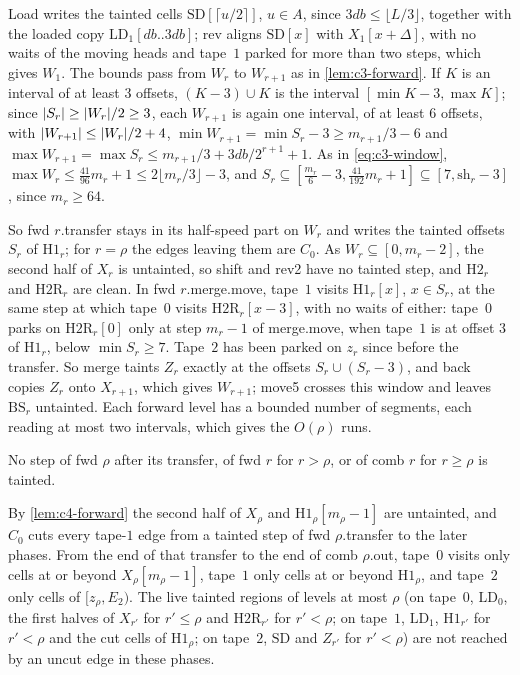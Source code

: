 \begin{informalproof}
Load writes the tainted cells $\mathrm{SD}[\lceil u/2\rceil]$, $u\in A$, since $3db\le\lfloor L/3\rfloor$, together with the loaded
copy $\mathrm{LD}_1[db..3db]$; rev aligns $\mathrm{SD}[x]$ with $X_1[x+\Delta]$, with no waits of the moving heads and tape~$1$ parked for
more than two steps, which gives $W_1$. The bounds pass from $W_r$ to $W_{r+1}$ as in \cref{lem:c3-forward}. If $K$ is an interval of
at least $3$ offsets, $(K-3)\cup K$ is the interval $[\min K-3,\max K]$; since $\lvert S_r \rvert\ge\lvert W_r \rvert/2\ge3$, each $W_{r+1}$ is again one
interval, of at least $6$ offsets, with $\lvert W_{r+1} \rvert\le\lvert W_r \rvert/2+4$, $\min W_{r+1}=\min S_r-3\ge m_{r+1}/3-6$ and
$\max W_{r+1}=\max S_r\le m_{r+1}/3+3db/2^{r+1}+1$. As in \eqref{eq:c3-window}, $\max W_r\le\frac{41}{96}m_r+1\le2\lfloor m_r/3\rfloor-3$,
and $S_r\subseteq[\frac{m_r}6-3,\frac{41}{192}m_r+1]\subseteq[7,\mathrm{sh}_r-3]$, since $m_r\ge64$.

So fwd $r$.transfer stays in its half-speed part on $W_r$ and writes the tainted offsets $S_r$ of $\mathrm{H1}_r$; for $r=\rho$ the
edges leaving them are $C_0$. As $W_r\subseteq[0,m_r-2]$, the second half of $X_r$ is untainted, so shift and rev2 have no tainted step,
and $\mathrm{H2}_r$ and $\mathrm{H2R}_r$ are clean. In fwd $r$.merge.move, tape~$1$ visits $\mathrm{H1}_r[x]$, $x\in S_r$, at the same
step at which tape~$0$ visits $\mathrm{H2R}_r[x-3]$, with no waits of either: tape~$0$ parks on $\mathrm{H2R}_r[0]$ only at
step $m_r-1$ of merge.move, when tape~$1$ is at offset $3$ of $\mathrm{H1}_r$, below $\min S_r\ge7$. Tape~$2$ has been parked on $z_r$ since
before the transfer. So merge taints $Z_r$ exactly at the offsets $S_r\cup(S_r-3)$, and back copies $Z_r$ onto $X_{r+1}$, which gives $W_{r+1}$;
move5 crosses this window and leaves $\mathrm{BS}_r$ untainted. Each forward level has a bounded number of segments, each reading at
most two intervals, which gives the $O(\rho)$ runs.
\end{informalproof}

\begin{lemma}\label{lem:c4-middle}
\notformalized
No step of fwd $\rho$ after its transfer, of fwd $r$ for $r>\rho$, or of comb $r$ for $r\ge\rho$ is tainted.
\end{lemma}

\begin{informalproof}
By \cref{lem:c4-forward} the second half of $X_\rho$ and $\mathrm{H1}_\rho[m_\rho-1]$ are untainted, and $C_0$ cuts every tape-$1$ edge
from a tainted step of fwd $\rho$.transfer to the later phases. From the end of that transfer to the end of comb $\rho$.out, tape~$0$
visits only cells at or beyond $X_\rho[m_\rho-1]$, tape~$1$ only cells at or beyond $\mathrm{H1}_\rho$, and tape~$2$ only cells of
$[z_\rho,E_2)$. The live tainted regions of levels at most $\rho$ (on tape~$0$, $\mathrm{LD}_0$, the first halves of $X_{r'}$ for
$r'\le\rho$ and $\mathrm{H2R}_{r'}$ for $r'<\rho$; on tape~$1$, $\mathrm{LD}_1$, $\mathrm{H1}_{r'}$ for $r'<\rho$ and the cut cells of
$\mathrm{H1}_\rho$; on tape~$2$, $\mathrm{SD}$ and $Z_{r'}$ for $r'<\rho$) are not reached by an uncut edge in these phases.
\end{informalproof}

